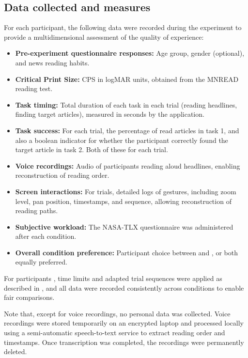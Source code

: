\subsection{Data collected and measures}

For each participant, the following data were recorded during the experiment to provide a multidimensional assessment of the quality of experience:
\begin{itemize}
    \item \textbf{Pre-experiment questionnaire responses:} Age group, gender (optional), and news reading habits.
    \item \textbf{Critical Print Size:} CPS in logMAR units, obtained from the MNREAD reading test.
    \item \textbf{Task timing:} Total duration of each task in each trial (reading headlines, finding target articles), measured in seconds by the application.
    \item \textbf{Task success:} For each trial, the percentage of read articles in task 1, and also a boolean indicator for whether the participant correctly found the target article in task 2. Both of these for each trial. 
    \item \textbf{Voice recordings:} Audio of participants reading aloud headlines, enabling reconstruction of reading order.
    \item \textbf{Screen interactions:} For \condonenot trials, detailed logs of gestures, including zoom level, pan position, timestamps, and sequence, allowing reconstruction of reading paths.
    \item \textbf{Subjective workload:} The NASA-TLX questionnaire was administered after each condition.
    \item \textbf{Overall condition preference:} Participant choice between \condonenot and \condtwonot, or both equally preferred.
\end{itemize}
For participants \LV, time limits and adapted trial sequences were applied as described in , and all data were recorded consistently across conditions to enable fair comparisons.

Note that, except for voice recordings, no personal data was collected. Voice recordings were stored temporarily on an encrypted laptop and processed locally using a semi-automatic speech-to-text service to extract reading order and timestamps. Once transcription was completed, the recordings were permanently deleted.






